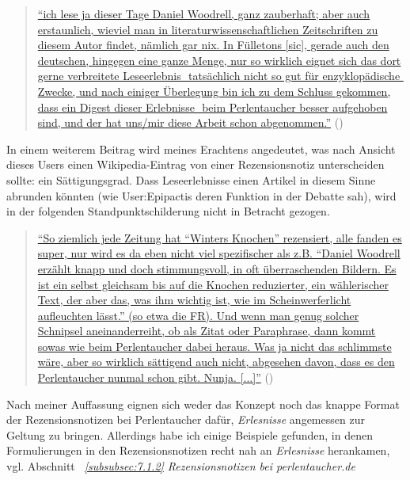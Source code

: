\documentclass[fontsize=12pt]{scrartcl}
\begin{document}
\singlespacing
\begin{quote}
\href{https://de.wikipedia.org/w/index.php?title=Benutzer_Diskussion:Edith_Wahr\&diff=prev\&oldid=138494233}{"`ich lese ja dieser Tage Daniel Woodrell, ganz zauberhaft; aber auch erstaunlich, wieviel man in li\-te\-ra\-tur\-\flq wissenschaftlichen\frq \,\,Zeitschriften zu diesem Autor findet, n\"amlich gar nix. In F\"ulletons [sic], gerade auch den deutschen, hingegen eine ganze Menge, nur so wirklich eignet sich das dort gerne verbreitete \flq Leseerlebnis\frq \,\, tats\"achlich nicht so gut f\"ur \flq enzy\-klop\"adische\frq \,\, Zwecke, und nach einiger \"Uberlegung bin ich zu dem Schluss gekommen, dass ein Digest dieser \flq Erlebnisse\frq \,\, beim Per\-len\-tau\-cher besser aufgehoben sind, und der hat uns/mir diese Arbeit schon abgenommen."'} (\cite{UserEdithWahr2015b})
\end{quote}
\onehalfspacing

In einem weiterem Beitrag wird meines Erachtens angedeutet, was nach Ansicht dieses Users einen Wi\-ki\-pe\-dia-Eintrag von einer Rezensionsnotiz unterscheiden sollte: ein S\"attigungsgrad. Dass Leseerlebnisse einen Artikel in diesem Sinne abrunden k\"onnten (wie \mbox{User}:Epipactis deren Funktion in der Debatte sah), wird in der folgenden Standpunktschilderung nicht in Betracht gezogen.

\singlespacing
\begin{quote}
\href{https://de.wikipedia.org/w/index.php?title=Benutzer_Diskussion:Edith_Wahr\&diff=next\&oldid=138508487}{"`So ziemlich jede Zeitung hat "`Winters Knochen"' rezensiert, alle fanden es super, nur wird es da eben nicht viel spezifischer als z.B. "`Daniel Woodrell erz\"ahlt knapp und doch stimmungsvoll, in oft \"uberraschenden Bildern. Es ist ein \mbox{selbst} gleichsam bis auf die Knochen reduzierter, ein w\"ahlerischer Text, der aber das, was ihm wichtig ist, wie im Scheinwerferlicht aufleuchten l\"asst."' (so etwa die FR). Und wenn man genug solcher Schnipsel aneinanderreiht, ob als Zitat oder Paraphrase, dann kommt sowas wie beim Per\-len\-tau\-cher dabei he\-raus. Was ja nicht das schlimmste w\"are, aber so wirklich s\"attigend auch nicht, abgesehen davon, dass es den Per\-len\-tau\-cher nunmal schon gibt. Nunja. [...]"'} (\cite{UserEdithWahr2015c})
\end{quote}
\onehalfspacing

Nach meiner Auffassung eignen sich weder das Konzept noch das knappe Format der Rezensionsnotizen bei Per\-len\-tau\-cher daf\"ur, \textit{Erlesnisse} angemessen zur Geltung zu bringen. Al\-ler\-dings habe ich einige Beispiele gefunden, in denen Formulierungen in den Rezensionsnotizen recht nah an \textit{Erlesnisse} herankamen, vgl. Abschnitt \textit{~\ref{subsubsec:7.1.2} Rezensionsnotizen bei per\-len\-tau\-cher.de} 
\end{document}
